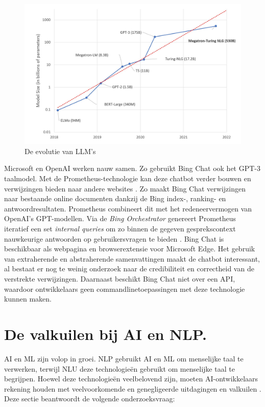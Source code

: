 \begin{figure}[H]
	\begin{center}
		\includegraphics[width=\linewidth]{img/graph-language-models.png}
		\caption{De evolutie van LLM's \autocite{Simon2021}}
		\label{img:graph-language-models}
	\end{center}
\end{figure}

Microsoft en OpenAI werken nauw samen. Zo gebruikt Bing Chat ook het GPT-3 taalmodel. Met de Prometheus-technologie kan deze chatbot verder bouwen en verwijzingen bieden naar andere websites \autocite{Ribas2023}. Zo maakt Bing Chat verwijzingen naar bestaande online documenten dankzij de Bing index-, ranking- en antwoordresultaten. Prometheus combineert dit met het redeneervermogen van OpenAI’s GPT-modellen. Via de \textit{Bing Orchestrator} genereert Prometheus iteratief een set \textit{internal queries} om zo binnen de gegeven gesprekscontext nauwkeurige antwoorden op gebruikersvragen te bieden \autocite{Ribas2023}. Bing Chat is beschikbaar als webpagina en browserextensie voor Microsoft Edge. Het gebruik van extraherende en abstraherende samenvattingen maakt de chatbot interessant, al bestaat er nog te weinig onderzoek naar de credibiliteit en correctheid van de verstrekte verwijzingen. Daarnaast beschikt Bing Chat niet over een API, waardoor ontwikkelaars geen commandlinetoepassingen met deze technologie kunnen maken.

\section{De valkuilen bij AI en NLP.}

AI en ML zijn volop in groei. NLP gebruikt AI en ML om menselijke taal te verwerken, terwijl NLU deze technologieën gebruikt om menselijke taal te begrijpen. Hoewel deze technologieën veelbelovend zijn, moeten AI-ontwikkelaars rekening houden met veelvoorkomende en genegligeerde uitdagingen en valkuilen \autocite{Sciforce2020, Roldos2020, Khurana2022}. Deze sectie beantwoordt de volgende onderzoeksvraag: 

